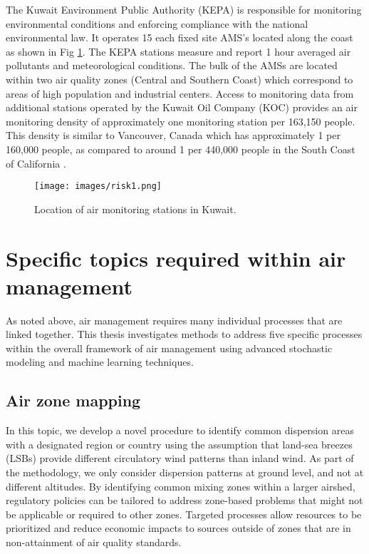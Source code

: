 The Kuwait Environment Public Authority (KEPA) is responsible for monitoring environmental conditions and enforcing compliance with the national environmental law. It operates 15 each fixed site AMS’s located along the coast as shown in Fig \ref{fig1:amskuwait}.  The KEPA stations measure and report 1 hour averaged air pollutants and meteorological conditions. The bulk of the AMSs are located within two air quality zones (Central and Southern Coast) which correspond to areas of high population and industrial centers. Access to monitoring data from additional stations operated by the Kuwait Oil Company (KOC) provides an air monitoring density of approximately one monitoring station per 163,150 people. This density is similar to Vancouver, Canada which has approximately 1 per 160,000 people, as compared to around 1 per 440,000 people in the South Coast of California \citep{Marshall2008}.

%  
\begin{figure}[H]
\centering
\texttt{[image: images/risk1.png]} 
\caption{Location of air monitoring stations in Kuwait.}
\label{fig1:amskuwait}
\end{figure}

\section{Specific topics required within air management}
As noted above, air management requires many individual processes that are linked together. This thesis investigates methods to address five specific processes within the overall framework of air management using advanced stochastic modeling and machine learning techniques.

\subsection{Air zone mapping}

In this topic, we develop a novel procedure to identify common dispersion areas with a designated region or country using the assumption that land-sea breezes (LSBs) provide different circulatory wind patterns than inland wind. As part of the methodology, we only consider dispersion patterns at ground level, and not at different altitudes. By identifying common mixing zones within a larger airshed, regulatory policies can be tailored to address zone-based problems that might not be applicable or required to other zones. Targeted processes allow resources to be prioritized and reduce economic impacts to sources outside of zones that are in non-attainment of air quality standards.

